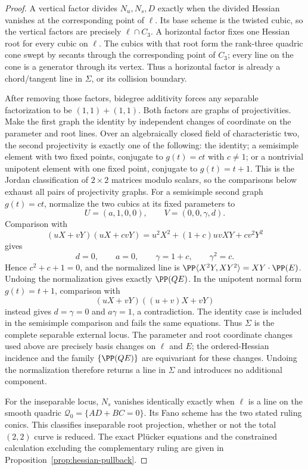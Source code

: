 \begin{proof}
A vertical factor divides $N_u,N_s,D$ exactly when the divided Hessian
vanishes at the corresponding point of $\ell$.  Its base scheme is the
twisted cubic, so the vertical factors are precisely
$\ell\cap C_3$.  A horizontal factor fixes one Hessian root for every
cubic on $\ell$.  The cubics with that root form the rank-three quadric
cone swept by secants through the corresponding point of $C_3$; every
line on the cone is a generator through its vertex.  Thus a horizontal
factor is already a chord/tangent line in $\Sigma$, or its collision
boundary.

After removing those factors, bidegree additivity forces any separable
factorization to be $(1,1)+(1,1)$.  Both factors are graphs of
projectivities.  Make the first graph the identity by independent
changes of coordinate on the parameter and root lines.  Over an
algebraically closed field of characteristic two, the second
projectivity is exactly one of the following: the identity; a
semisimple element with two fixed points, conjugate to $g(t)=ct$ with
$c\ne1$; or a nontrivial unipotent element with one fixed point,
conjugate to $g(t)=t+1$.  This is the Jordan classification of
$2\times2$ matrices modulo scalars, so the comparisons below exhaust
all pairs of projectivity graphs.  For a semisimple second graph
$g(t)=ct$, normalize the two cubics at its fixed
parameters to
\[
             U=(a,1,0,0),\qquad V=(0,0,\gamma,d).
\]
Comparison with
\[
 (uX+vY)(uX+cvY)
 =u^2X^2+(1+c)uvXY+cv^2Y^2
\]
gives
\[
 d=0,\qquad a=0,\qquad\gamma=1+c,\qquad\gamma^2=c.
\]
Hence $c^2+c+1=0$, and the normalized line is
$\PP\langle X^2Y,XY^2\rangle=XY\cdot\PP(E)$.  Undoing the
normalization gives exactly $\PP(QE)$.  In the unipotent normal form
$g(t)=t+1$, comparison with
\[
             (uX+vY)((u+v)X+vY)
\]
instead gives $d=\gamma=0$ and $a\gamma=1$, a contradiction.  The
identity case is included in the semisimple comparison and fails the
same equations.  Thus $\Sigma$ is the complete separable external
locus.  The parameter and root coordinate changes used above are
precisely basis changes on $\ell$ and $E$; the ordered-Hessian
incidence and the family $\{\PP(QE)\}$ are equivariant for these
changes.  Undoing the normalization therefore returns a line in
$\Sigma$ and introduces no additional component.

For the inseparable locus, $N_s$ vanishes identically exactly when
$\ell$ is a line on the smooth quadric
$\mathcal Q_0=\{AD+BC=0\}$.  Its Fano scheme has the two stated
ruling conics.  This classifies inseparable root projection, whether
or not the total $(2,2)$ curve is reduced.  The exact Pl\"ucker
equations and the constrained calculation excluding the complementary
ruling are given in Proposition~\ref{prop:hessian-pullback}.
\end{proof}

